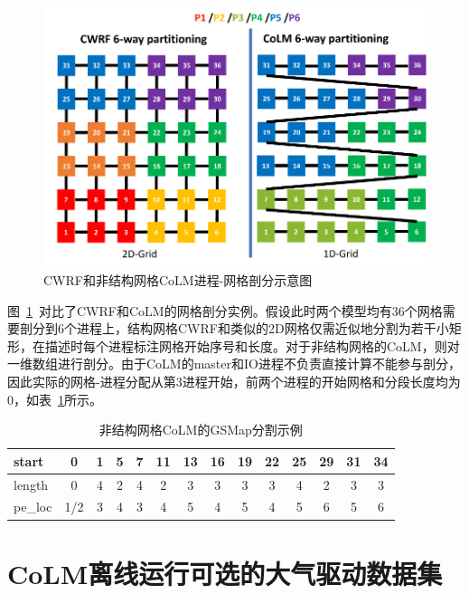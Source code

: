 {
\begin{figure}[htbp]
\centering
\includegraphics{Figures/附录/CWRF和非结构网格CoLM进程-网格剖分示意图.png}
\caption{CWRF和非结构网格CoLM进程-网格剖分示意图}
\label{fig:进程-网格剖分示意图}
\end{figure}
}

图~\ref{fig:进程-网格剖分示意图}~对比了CWRF和CoLM的网格剖分实例。假设此时两个模型均有36个网格需要剖分到6个进程上，结构网格CWRF和类似的2D网格仅需近似地分割为若干小矩形，在描述时每个进程标注网格开始序号和长度。对于非结构网格的CoLM，则对一维数组进行剖分。由于CoLM的master和IO进程不负责直接计算不能参与剖分，因此实际的网格-进程分配从第3进程开始，前两个进程的开始网格和分段长度均为0，如表~\ref{tab:CoLM剖分}所示。

\begin{table}[htbp]
\centering
\caption{非结构网格CoLM的GSMap分割示例}
\label{tab:CoLM剖分}
\begin{tabular}{@{}lccccccccccccc@{}}
\toprule
start  & 0 & 1 & 5 & 7 & 11 & 13 & 16 & 19 & 22 & 25 & 29 & 31 & 34 \\ \midrule
length & 0 & 4 & 2 & 4 & 2 & 3 & 3 & 3 & 3 & 4 & 2 & 3 & 3 \\ \midrule
pe\_loc & 1/2 & 3 & 4 & 3 & 4 & 5 & 4 & 5 & 4 & 5 & 6 & 5 & 6 \\ \bottomrule
\end{tabular}
\end{table}


\chapter{CoLM离线运行可选的大气驱动数据集}


